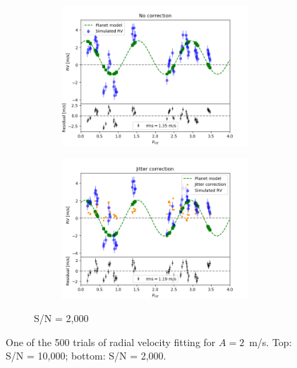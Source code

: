 \begin{figure}[tbp]
    \begin{subfigure}[b]{1.0\textwidth}
    		\begin{subfigure}[b]{0.49\textwidth}
        		\includegraphics[width=\textwidth]{./Figures/Methods/Fitting_5-Fit2.png}
		\end{subfigure}
		\begin{subfigure}[b]{0.49\textwidth}        		
        		\includegraphics[width=\textwidth]{./Figures/Methods/Fitting_5-Fit1_XY.png}
        	\end{subfigure}
        	\caption{S/N = 2,000}
    \end{subfigure}	       
    \caption[Planet recovery ($A = 2$~m/s)]
    {One of the 500 trials of radial velocity fitting for $A = 2$~m/s. Top: S/N = 10,000; bottom: S/N = 2,000.}
\label{fig:Planet_recovery_p2}
\end{figure}    

